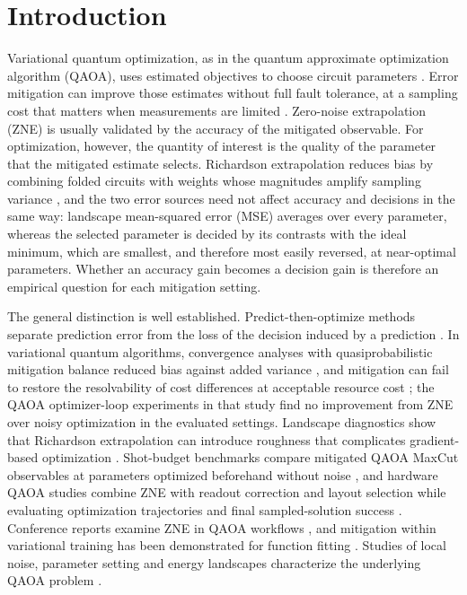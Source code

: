 \section{Introduction}
Variational quantum optimization, as in the quantum approximate optimization algorithm (QAOA), uses estimated objectives to choose circuit parameters \citep{Farhi2014,Zhou2020QAOA,Cerezo2021VQAReview}. Error mitigation can improve those estimates without full fault tolerance, at a sampling cost that matters when measurements are limited \citep{Temme2017,LiBenjamin2017,Cai2023QEM,Takagi2022LimitsQEM}. Zero-noise extrapolation (ZNE) is usually validated by the accuracy of the mitigated observable. For optimization, however, the quantity of interest is the quality of the parameter that the mitigated estimate selects. Richardson extrapolation reduces bias by combining folded circuits with weights whose magnitudes amplify sampling variance \citep{Krebsbach2022RichardsonOptimization}, and the two error sources need not affect accuracy and decisions in the same way: landscape mean-squared error (MSE) averages over every parameter, whereas the selected parameter is decided by its contrasts with the ideal minimum, which are smallest, and therefore most easily reversed, at near-optimal parameters. Whether an accuracy gain becomes a decision gain is therefore an empirical question for each mitigation setting.

The general distinction is well established. Predict-then-optimize methods separate prediction error from the loss of the decision induced by a prediction \citep{ElmachtoubGrigas2022SPO}. In variational quantum algorithms, convergence analyses with quasiprobabilistic mitigation balance reduced bias against added variance \citep{JoseSimeone2022Convergence}, and mitigation can fail to restore the resolvability of cost differences at acceptable resource cost \citep{Wang2024Trainability}; the QAOA optimizer-loop experiments in that study find no improvement from ZNE over noisy optimization in the evaluated settings. Landscape diagnostics show that Richardson extrapolation can introduce roughness that complicates gradient-based optimization \citep{Liu2023OSCAR}. Shot-budget benchmarks compare mitigated QAOA MaxCut observables at parameters optimized beforehand without noise \citep{Bultrini2023UNITED}, and hardware QAOA studies combine ZNE with readout correction and layout selection while evaluating optimization trajectories and final sampled-solution success \citep{Cheng2024DARBO}. Conference reports examine ZNE in QAOA workflows \citep{Venere2024ZNEQAOAWorkflow,Lusso2025NoiseMitigationQAOA}, and mitigation within variational training has been demonstrated for function fitting \citep{Robbiati2026RealtimeQEMVQA}. Studies of local noise, parameter setting and energy landscapes characterize the underlying QAOA problem \citep{Marshall2020LocalNoiseQAOA,Sureshbabu2024ParameterSettingWeightedQAOA,BoyWales2024EnergyLandscapesQAOA}.

